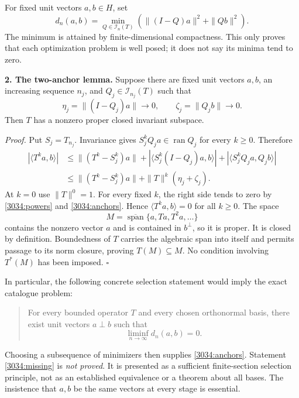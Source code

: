 \documentclass[11pt,a4paper]{article}
\numberwithin{equation}{section}
\begin{document}
For fixed unit vectors $a,b\in H$, set
\begin{equation}\label{3034:objective}
 d_n(a,b)=\min_{Q\in\mathcal I_n(T)}
 \left(\|(I-Q)a\|^2+\|Qb\|^2\right).
\end{equation}
The minimum is attained by finite-dimensional compactness. This only proves
that each optimization problem is well posed; it does not say its minima
tend to zero.

\medskip
\textbf{2. The two-anchor lemma.}
Suppose there are fixed unit vectors $a,b$, an increasing sequence $n_j$, and
$Q_j\in\mathcal I_{n_j}(T)$ such that
\begin{equation}\label{3034:anchors}
 \eta_j=\|(I-Q_j)a\|\longrightarrow0,
 \qquad \zeta_j=\|Q_jb\|\longrightarrow0.
\end{equation}
Then $T$ has a nonzero proper closed invariant subspace.

\emph{Proof.} Put $S_j=T_{n_j}$. Invariance gives
$S_j^kQ_ja\in\operatorname{ran}Q_j$ for every $k\geq0$. Therefore
\begin{align}
 |\langle T^ka,b\rangle|
 &\leq \|(T^k-S_j^k)a\|
       +|\langle S_j^k(I-Q_j)a,b\rangle|
       +|\langle S_j^kQ_ja,Q_jb\rangle|\nonumber\\
 &\leq\|(T^k-S_j^k)a\|+\|T\|^k(\eta_j+\zeta_j).
 \label{3034:anchor-estimate}
\end{align}
At $k=0$ use $\|T\|^0=1$. For every fixed $k$, the right side tends to zero
by \eqref{3034:powers} and \eqref{3034:anchors}. Hence
$\langle T^ka,b\rangle=0$ for all $k\geq0$. The space
\begin{equation}\label{3034:cyclic-space}
 M=\overline{\operatorname{span}}\{a,Ta,T^2a,\ldots\}
\end{equation}
contains the nonzero vector $a$ and is contained in $b^\perp$, so it is
proper. It is closed by definition. Boundedness of $T$ carries the algebraic
span into itself and permits passage to its norm closure, proving
$T(M)\subseteq M$. No condition involving $T^*(M)$ has been imposed.
$\square$

In particular, the following concrete selection statement would imply the
exact catalogue problem:
\begin{quote}
For every bounded operator $T$ and every chosen orthonormal basis, there
exist unit vectors $a\perp b$ such that
\begin{equation}\label{3034:missing}
 \liminf_{n\to\infty}d_n(a,b)=0.
\end{equation}
\end{quote}
Choosing a subsequence of minimizers then supplies \eqref{3034:anchors}.
Statement \eqref{3034:missing} is \emph{not proved}. It is presented as a
sufficient finite-section selection principle, not as an established
equivalence or a theorem about all bases. The insistence that $a,b$ be the
same vectors at every stage is essential.
\end{document}
